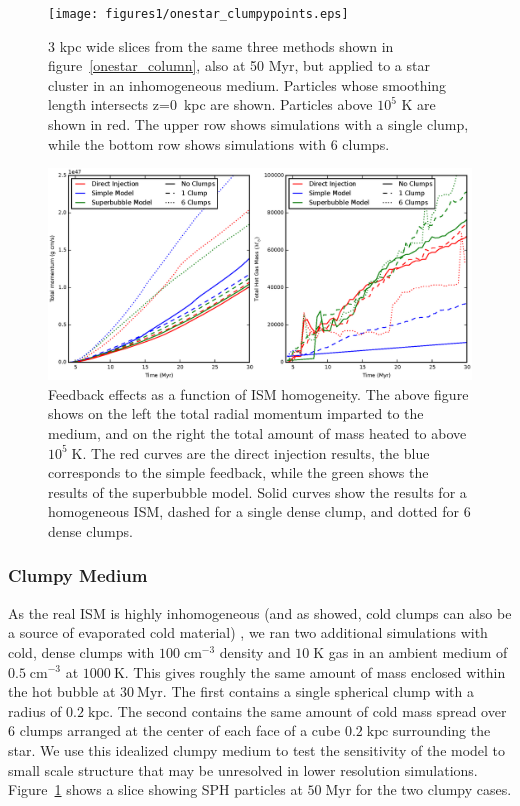 \begin{figure}
    \texttt{[image: figures1/onestar\_clumpypoints.eps]}
    \caption[Image of superbubbles in a clumpy ISM]{3 kpc wide slices
    from the same three methods shown in figure~\ref{onestar_column}, also at 50
    Myr, but applied to a star cluster in an inhomogeneous medium.  Particles
    whose smoothing length intersects z=0~kpc are shown.  Particles above $10^5$
    K are shown in red.  The upper row shows simulations with a single clump,
    while the bottom row shows simulations with 6 clumps.}
    \label{onestar_clumpyslice}
\end{figure}

\begin{figure}
    \includegraphics[width=\textwidth]{figures1/onestar_clumpy.eps}
    \caption[Feedback effects as a function of ISM homogeneity]{Feedback effects
    as a function of ISM homogeneity.  The above figure shows on the left the
    total radial momentum imparted to the medium, and on the right the total
    amount of mass heated to above $10^5\;\mathrm{K}$.  The red curves are the
    direct injection results, the blue corresponds to the simple feedback, while
    the green shows the results of the superbubble model.  Solid curves show the
    results for a homogeneous ISM, dashed for a single dense clump, and dotted
    for 6 dense clumps.}
    \label{onestar_clumpy}
\end{figure}

\subsubsection{Clumpy Medium}\label{clumpy}
As the real ISM is highly inhomogeneous (and as \citet{Silich1996} showed, cold
clumps can also be a source of evaporated cold material) , we ran two additional
simulations with cold, dense clumps with $100\;\mathrm{cm^{-3}}$ density and
$10\;\mathrm{K}$ gas in an ambient medium of $0.5\;\mathrm{cm^{-3}}$ at
$1000\:\mathrm{K}$.  This gives roughly the same amount of mass enclosed within
the hot bubble at $30\:\mathrm{Myr}$.  The first contains a single spherical
clump with a radius of $0.2\;\mathrm{kpc}$.  The second contains the same amount
of cold mass spread over 6 clumps arranged at the center of each face of a cube
$0.2\;\mathrm{kpc}$ surrounding the star.  We use this idealized clumpy medium
to test the sensitivity of the model to small scale structure that may be
unresolved in lower resolution simulations. Figure~\ref{onestar_clumpyslice}
shows a slice showing SPH particles at $50\;\mathrm{Myr}$ for the two clumpy
cases.  

